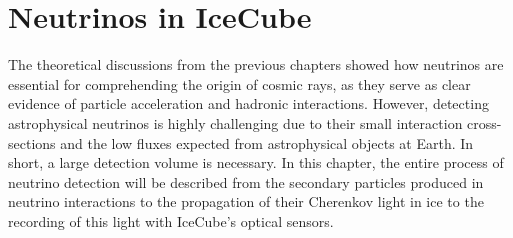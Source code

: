 \setchapterpreamble[u]{\margintoc}
\chapter{Neutrinos in IceCube} 


The theoretical discussions from the previous chapters showed how neutrinos are essential for comprehending the origin of cosmic rays, as they serve as clear evidence of particle acceleration and hadronic interactions. However, detecting astrophysical neutrinos is highly challenging due to their small interaction cross-sections and the low fluxes expected from astrophysical objects at Earth. In short, a large detection volume is necessary. In this chapter, the entire process of neutrino detection will be described from the secondary particles produced in neutrino interactions to the propagation of their Cherenkov light in ice to the recording of this light with IceCube’s optical sensors.


